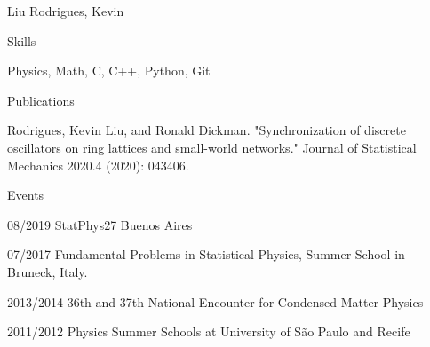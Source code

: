 \documentclass[12pt,a4paper]{article}
\begin{document}
\begin{cv}{Liu Rodrigues, Kevin}
  \begin{cvlist}{Skills}
  \item[] Physics, Math, C, C++, Python, Git
  \end{cvlist}

  \begin{cvlist}{Publications}
  \item[] Rodrigues, Kevin Liu, and Ronald Dickman. "Synchronization of discrete oscillators on ring lattices and small-world networks." Journal of Statistical Mechanics 2020.4 (2020): 043406.
  \end{cvlist}

  \begin{cvlist}{Events}
  \item[08/2019] StatPhys27 Buenos Aires
  \item[07/2017] Fundamental Problems in Statistical Physics, Summer School in Bruneck, Italy.
  \item[2013/2014] 36th and 37th National Encounter for Condensed Matter Physics 
  \item[2011/2012] Physics Summer Schools at University of São Paulo and Recife
  \end{cvlist}

\end{cv}
\end{document}
